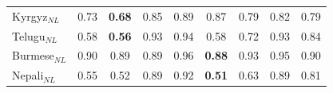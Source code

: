 \begin{table}[t]
\begin{minipage}[t]{0.49\textwidth}
{\begin{tabular}{lcccccccc}
Kyrgyz$_{NL}$ & 0.73 & \textbf{0.68} & 0.85 & 0.89 & 0.87 & 0.79 & 0.82 & 0.79 \\
Telugu$_{NL}$ & 0.58 & \textbf{0.56} & 0.93 & 0.94 & 0.58 & 0.72 & 0.93 & 0.84 \\
Burmese$_{NL}$ & 0.90 & 0.89 & 0.89 & 0.96 & \textbf{0.88} & 0.93 & 0.95 & 0.90 \\
Nepali$_{NL}$ & 0.55 & 0.52 & 0.89 & 0.92 & \textbf{0.51} & 0.63 & 0.89 & 0.81 \\
\bottomrule
\end{tabular}}
\end{minipage}
\end{table}
